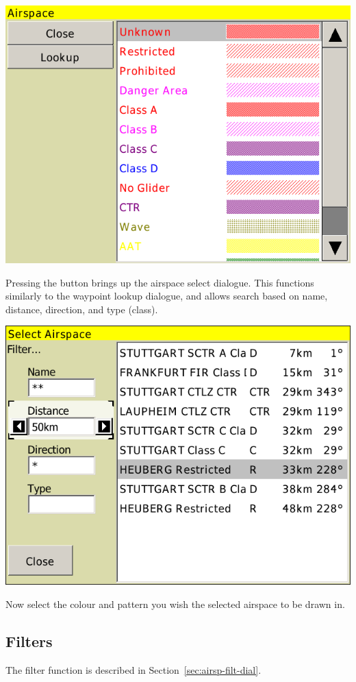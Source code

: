 \begin{center}
\includegraphics[angle=0,width=0.8\linewidth,keepaspectratio='true']{figures/config-airspacecolors.png}
\end{center}

Pressing the  button brings up the airspace select dialogue.
This functions similarly to the waypoint lookup dialogue, and allows
search based on name, distance, direction, and type (class).  

\begin{center}
\includegraphics[angle=0,width=0.8\linewidth,keepaspectratio='true']{figures/airspacelookup.png}
\end{center}

Now select the colour and pattern you wish the selected airspace to be drawn in.


\subsection*{Filters}
The filter function is described in Section~\ref{sec:airsp-filt-dial}.

